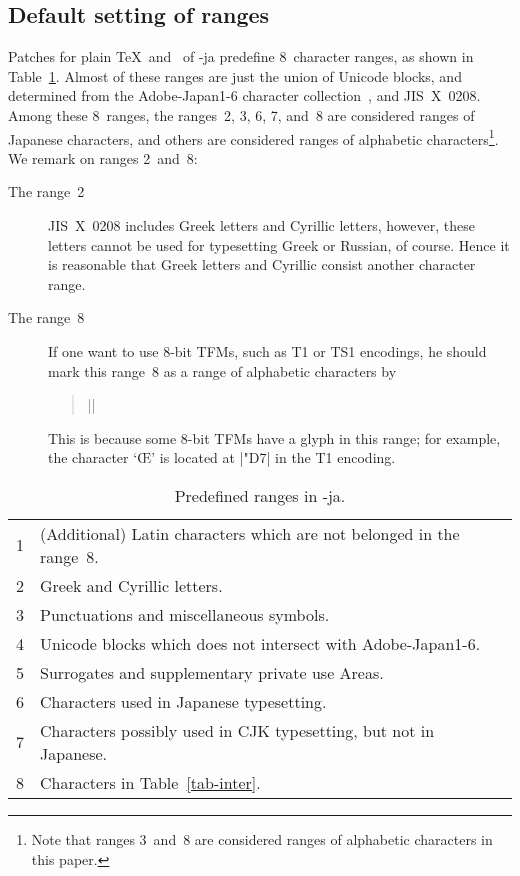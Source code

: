 \documentclass{ajt}
\begin{document}
\subsection{Default setting of ranges}
Patches for plain \TeX\ and \LaTeXe\ of \LuaTeX-ja predefine 8~character
ranges, as shown in Table~\ref{tab-chrrng}.  Almost of these ranges are
just the union of Unicode blocks, and determined from the Adobe-Japan1-6
character collection~\cite{aj16}, and JIS~X~0208. Among these 8~ranges,
the ranges~2, 3, 6, 7, and~8 are considered ranges of Japanese
characters, and others are considered ranges of alphabetic
characters\footnote{Note that ranges 3~and~8 are considered ranges of
alphabetic characters in this paper.}. We remark on ranges 2~and~8:
\begin{description}
\item[The range~2]
JIS~X~0208 includes Greek letters and Cyrillic letters, however, these
	   letters cannot be used for typesetting Greek or Russian, of
	   course. Hence it is reasonable that Greek letters and
	   Cyrillic consist another character range.
\item[The range~8] 
If one want to use 8-bit TFMs, such as T1 or TS1 encodings, he should
	   mark this range~8 as a range of alphabetic characters by
\begin{quote}
||
\end{quote}
This is because some 8-bit TFMs have a glyph in this range; for example,
	   the character `\OE' is located at |"D7| in the T1 encoding. %
\end{description}


\begin{table}
\caption{Predefined ranges in \LuaTeX-ja.}
\label{tab-chrrng}
\begin{center}
\begin{tabular}{@{\bf}rl}
1&(Additional) Latin characters which are not belonged in the range~8.\\
2&Greek and Cyrillic letters.\\
3&Punctuations and miscellaneous symbols.\\
4&Unicode blocks which does not intersect with Adobe-Japan1-6.\\
5&Surrogates and supplementary private use Areas.\\
6&Characters used in Japanese typesetting.\\
7&Characters possibly used in CJK typesetting, but not in Japanese.\\
8&Characters in Table~\ref{tab-inter}.
\end{tabular}
\end{center}
\end{table}
\end{document}

